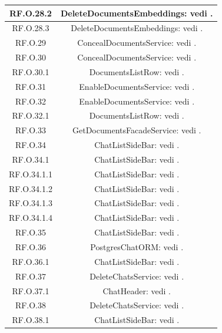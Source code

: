 \documentclass[10pt, a4paper]{article}
\begin{document}
\begin{xltabular}{\textwidth}{c|c}
\hline
RF.O.28.2 & DeleteDocumentsEmbeddings: vedi .\\
\hline
RF.O.28.3 & DeleteDocumentsEmbeddings: vedi .\\
\hline
RF.O.29 & ConcealDocumentsService: vedi .\\
\hline
RF.O.30 & ConcealDocumentsService: vedi . \\
\hline
RF.O.30.1 & DocumentsListRow: vedi . \\
\hline
RF.O.31 & EnableDocumentsService: vedi .\\
\hline
RF.O.32 & EnableDocumentsService: vedi .\\
\hline
RF.O.32.1 & DocumentsListRow: vedi .\\
\hline
RF.O.33 & GetDocumentsFacadeService: vedi .\\
\hline
RF.O.34  &  ChatListSideBar: vedi . \\  
\hline
RF.O.34.1 & ChatListSideBar: vedi . \\  
\hline
RF.O.34.1.1 & ChatListSideBar: vedi . \\  
\hline
RF.O.34.1.2  & ChatListSideBar: vedi . \\  
\hline
RF.O.34.1.3 & ChatListSideBar: vedi . \\  
\hline
RF.O.34.1.4 & ChatListSideBar: vedi . \\ 
\hline
RF.O.35 & ChatListSideBar: vedi . \\
\hline
RF.O.36 & PostgresChatORM: vedi .\\
\hline
RF.O.36.1 & ChatListSideBar: vedi . \\
\hline
RF.O.37 & DeleteChatsService: vedi .\\
\hline
RF.O.37.1 & ChatHeader: vedi . \\
\hline
RF.O.38 & DeleteChatsService: vedi .\\
\hline
RF.O.38.1 & ChatListSideBar: vedi . \\  

\end{xltabular}
\end{document}
